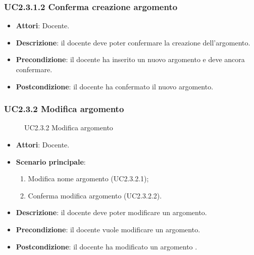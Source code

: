 \subsubsection{UC2.3.1.2 Conferma creazione argomento}
\begin{itemize}
\item \textbf{Attori}: Docente.
\item \textbf{Descrizione}: il docente deve poter confermare la creazione dell'argomento.
\item \textbf{Precondizione}: il docente ha inserito un nuovo argomento e deve ancora confermare.
\item \textbf{Postcondizione}: il docente ha confermato il nuovo argomento.
\end{itemize}
\subsubsection{UC2.3.2 Modifica argomento}
\begin{figure}[H]
\centering
\noindent{}
\caption{UC2.3.2 Modifica argomento}
\end{figure}
\begin{itemize}
\item \textbf{Attori}: Docente.
\item \textbf{Scenario principale}:
\begin{enumerate}
\item Modifica nome argomento (UC2.3.2.1);
\item Conferma modifica argomento (UC2.3.2.2).
\end{enumerate}
\item \textbf{Descrizione}: il docente deve poter modificare un argomento.
\item \textbf{Precondizione}: il docente vuole modificare un argomento.
\item \textbf{Postcondizione}: il docente ha modificato un argomento .
\end{itemize}

